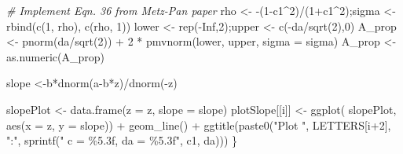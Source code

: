 \documentclass[
]{book}
\newenvironment{Shaded}{\begin{snugshade}}{\end{snugshade}}
\newcommand{\AttributeTok}[1]{\textcolor[rgb]{0.77,0.63,0.00}{#1}}
\newcommand{\CommentTok}[1]{\textcolor[rgb]{0.56,0.35,0.01}{\textit{#1}}}
\newcommand{\ConstantTok}[1]{\textcolor[rgb]{0.00,0.00,0.00}{#1}}
\newcommand{\DecValTok}[1]{\textcolor[rgb]{0.00,0.00,0.81}{#1}}
\newcommand{\FunctionTok}[1]{\textcolor[rgb]{0.00,0.00,0.00}{#1}}
\newcommand{\NormalTok}[1]{#1}
\newcommand{\OtherTok}[1]{\textcolor[rgb]{0.56,0.35,0.01}{#1}}
\newcommand{\SpecialCharTok}[1]{\textcolor[rgb]{0.00,0.00,0.00}{#1}}
\newcommand{\StringTok}[1]{\textcolor[rgb]{0.31,0.60,0.02}{#1}}
\begin{document}
\begin{Shaded}
\begin{Highlighting}[]
  \CommentTok{\# Implement Eqn. 36 from Metz{-}Pan paper }
\NormalTok{  rho }\OtherTok{\textless{}{-}} \SpecialCharTok{{-}}\NormalTok{(}\DecValTok{1}\SpecialCharTok{{-}}\NormalTok{c1}\SpecialCharTok{\^{}}\DecValTok{2}\NormalTok{)}\SpecialCharTok{/}\NormalTok{(}\DecValTok{1}\SpecialCharTok{+}\NormalTok{c1}\SpecialCharTok{\^{}}\DecValTok{2}\NormalTok{);sigma }\OtherTok{\textless{}{-}} \FunctionTok{rbind}\NormalTok{(}\FunctionTok{c}\NormalTok{(}\DecValTok{1}\NormalTok{, rho), }\FunctionTok{c}\NormalTok{(rho, }\DecValTok{1}\NormalTok{))}
\NormalTok{  lower }\OtherTok{\textless{}{-}} \FunctionTok{rep}\NormalTok{(}\SpecialCharTok{{-}}\ConstantTok{Inf}\NormalTok{,}\DecValTok{2}\NormalTok{);upper }\OtherTok{\textless{}{-}} \FunctionTok{c}\NormalTok{(}\SpecialCharTok{{-}}\NormalTok{da}\SpecialCharTok{/}\FunctionTok{sqrt}\NormalTok{(}\DecValTok{2}\NormalTok{),}\DecValTok{0}\NormalTok{)}
\NormalTok{  A\_prop }\OtherTok{\textless{}{-}} \FunctionTok{pnorm}\NormalTok{(da}\SpecialCharTok{/}\FunctionTok{sqrt}\NormalTok{(}\DecValTok{2}\NormalTok{)) }\SpecialCharTok{+} 
    \DecValTok{2} \SpecialCharTok{*} \FunctionTok{pmvnorm}\NormalTok{(lower, upper, }\AttributeTok{sigma =}\NormalTok{ sigma)}
\NormalTok{  A\_prop }\OtherTok{\textless{}{-}}  \FunctionTok{as.numeric}\NormalTok{(A\_prop)}
  
\NormalTok{  slope }\OtherTok{\textless{}{-}}\NormalTok{b}\SpecialCharTok{*}\FunctionTok{dnorm}\NormalTok{(a}\SpecialCharTok{{-}}\NormalTok{b}\SpecialCharTok{*}\NormalTok{z)}\SpecialCharTok{/}\FunctionTok{dnorm}\NormalTok{(}\SpecialCharTok{{-}}\NormalTok{z)}
  
\NormalTok{  slopePlot }\OtherTok{\textless{}{-}} \FunctionTok{data.frame}\NormalTok{(}\AttributeTok{z =}\NormalTok{ z, }\AttributeTok{slope =}\NormalTok{ slope)}
\NormalTok{  plotSlope[[i]] }\OtherTok{\textless{}{-}} \FunctionTok{ggplot}\NormalTok{(}
\NormalTok{    slopePlot, }\FunctionTok{aes}\NormalTok{(}\AttributeTok{x =}\NormalTok{ z, }\AttributeTok{y =}\NormalTok{ slope)) }\SpecialCharTok{+} 
    \FunctionTok{geom\_line}\NormalTok{() }\SpecialCharTok{+}
    \FunctionTok{ggtitle}\NormalTok{(}\FunctionTok{paste0}\NormalTok{(}\StringTok{"Plot "}\NormalTok{, }
\NormalTok{                   LETTERS[i}\SpecialCharTok{+}\DecValTok{2}\NormalTok{], }
                   \StringTok{":"}\NormalTok{, }
                   \FunctionTok{sprintf}\NormalTok{(}\StringTok{" c = \%5.3f, da = \%5.3f"}\NormalTok{, }
\NormalTok{                           c1, da)))}
\NormalTok{\}}
\end{Highlighting}
\end{Shaded}
\end{document}
